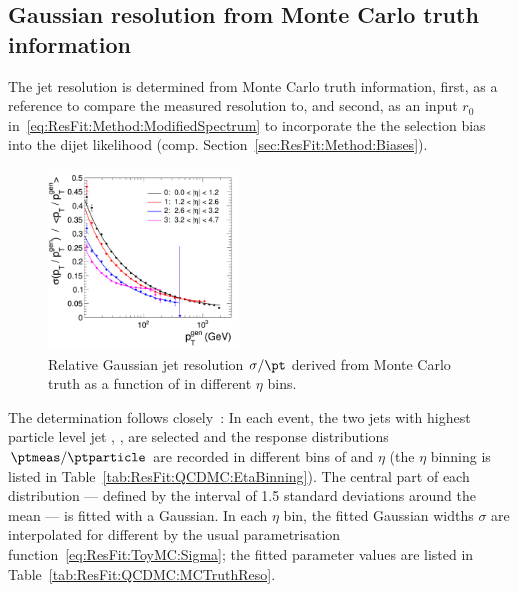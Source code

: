 \subsection{Gaussian resolution from Monte Carlo truth information}\label{sec:ResFit:QCDMC:MCTruthReso}

The jet \pt resolution is determined from Monte Carlo truth information, first, as a reference to compare the measured resolution to, and second, as an input $r_{0}$ in~\eqref{eq:ResFit:Method:ModifiedSpectrum} to incorporate the the selection bias into the dijet likelihood (comp. Section~\ref{sec:ResFit:Method:Biases}).
\begin{figure}[ht]
  \begin{center}
     \includegraphics[width=0.45\textwidth]{figures/resFit_QCD_MCTruthResolution}
   \end{center}
   \caption{Relative Gaussian jet \pt resolution $\sigma/\pt$ derived from Monte Carlo truth as a function of \pt in different $\eta$ bins.}
   \label{fig:ResFit:ToyMC:Sample:Spectrum}
\end{figure}
The determination follows closely~\cite{}:
In each event, the two jets with highest particle level jet \pt, \ptparticle, are selected and the response distributions \mbox{$\ptmeas / \ptparticle$} are recorded in different bins of \ptparticle and $\eta$ (the $\eta$ binning is listed in Table~\ref{tab:ResFit:QCDMC:EtaBinning}).
The central part of each distribution --- defined by the interval of 1.5 standard deviations around the mean --- is fitted with a Gaussian.
In each $\eta$ bin, the fitted Gaussian widths $\sigma$ are interpolated for different \pt by the usual parametrisation function~\eqref{eq:ResFit:ToyMC:Sigma}; the fitted parameter values are listed in Table~\ref{tab:ResFit:QCDMC:MCTruthReso}.
